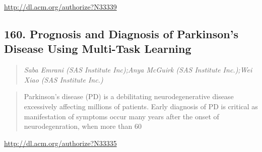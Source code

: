 \documentclass{article}
\begin{document}
\href{http://dl.acm.org/authorize?N33339}{http://dl.acm.org/authorize?N33339}

\subsection{160. Prognosis and Diagnosis of Parkinson’s Disease Using Multi-Task Learning}

\begin{quote}
\footnotesize{\textit{Saba Emrani (SAS Institute Inc);Anya McGuirk (SAS Institute Inc.);Wei Xiao (SAS Institute Inc.)}}

\end{quote}

\begin{quote}
Parkinson’s disease (PD) is a debilitating neurodegenerative disease excessively affecting millions of patients. Early diagnosis of PD is critical as manifestation of symptoms occur many years after the onset of neurodegenration, when more than 60%
\end{quote}

\href{http://dl.acm.org/authorize?N33335}{http://dl.acm.org/authorize?N33335}
\end{document}
